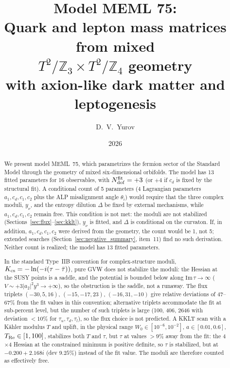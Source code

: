 \documentclass[12pt,a4paper]{article}
\title{\textbf{Model MEML 75:}\\[0.3cm]
\large Quark and lepton mass matrices from mixed \\
\(T^2/\mathbb{Z}_3 \times T^2/\mathbb{Z}_4\) geometry \\
with axion-like dark matter and leptogenesis}
\author{D.~V.~Yurov}
\date{2026}
\numberwithin{equation}{section}
\begin{document}
\maketitle

\begin{abstract}
\noindent
We present model MEML~75, which parametrizes the fermion
sector of the Standard Model through the geometry of mixed
six-dimensional orbifolds. The model has 13 fitted parameters
for 16 observables, with \(N_{\rm dof}^{\rm fit} = +3\) (or \(+4\)
if \(c_d\) is fixed by the structural fit). A conditional count of 5
parameters (4 Lagrangian parameters \(a_1, c_d, c_1, c_2\) plus the ALP
misalignment angle \(\theta_i\)) would require that the three complex
moduli, \(y_\nu\), and the entropy dilution \(\Delta\) be fixed by
external mechanisms, while \(a_1, c_d, c_1, c_2\) remain free. This
condition is not met: the moduli are not stabilized
(Sections~\ref{sec:flux}--\ref{sec:kklt}), \(y_\nu\) is fitted, and
\(\Delta\) is conditional on the curvaton. If, in addition,
\(a_1, c_d, c_1, c_2\) were derived from the geometry, the count would
be 1, not 5; extended searches (Section~\ref{sec:negative_summary},
item~11) find no such derivation. Neither count is realized; the
model has 13 fitted parameters.

In the standard Type~IIB convention for complex-structure moduli,
\(K_{\rm cs} = -\ln(-i(\tau-\bar\tau))\), pure GVW does not stabilize
the moduli: the Hessian at the SUSY points is a saddle, and the
potential is bounded below along \(\mathrm{Im}\,\tau\to\infty\)
(\(V\sim+3|a_2|^2 y^3\to+\infty\)), so the obstruction is the saddle,
not a runaway. The flux triplets \((-30,5,16)\), \((-15,-17,23)\),
\((-16,31,-10)\) give relative deviations of \(47\)--\(67\%\)
from the fit values in this convention; alternative
triplets accommodate the fit at sub-percent level, but the number
of such triplets is large (100, 406, 2646 with deviation \(<10\%\) for
\(\tau_u, \tau_d, \tau_l\)), so the flux choice is not predicted.
A KKLT scan with a K\"ahler modulus \(T\) and uplift, in the physical
range \(W_0 \in [10^{-6},10^{-2}]\), \(a \in [0.01,0.6]\),
\(T_{\rm Re} \in [1,100]\), stabilizes both \(T\) and \(\tau\), but
\(\tau\) at values \(>9\%\) away from the fit: the 4\(\times\)4 Hessian
at the constrained minimum is positive definite, so \(\tau\) is
stabilized, but at \(-0.200+2.168i\) (dev \(9.25\%\)) instead of the
fit value. The moduli are therefore counted as effectively free.


\end{abstract}
\end{document}
